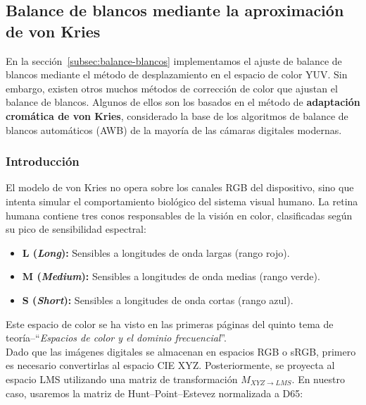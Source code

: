 \documentclass[11pt]{article}
\begin{document}
          \clearpage

  \subsection{Balance de blancos mediante la aproximación de von Kries}

      \noindent
      En la sección~\ref{subsec:balance-blancos} implementamos el ajuste de balance de blancos mediante el método de desplazamiento en el espacio de color YUV. Sin embargo, existen otros muchos métodos de corrección de color que ajustan el balance de blancos. Algunos de ellos son los basados en el método de \textbf{adaptación cromática de von Kries}, considerado la base de los algoritmos de balance de blancos automáticos (AWB) de la mayoría de las cámaras digitales modernas. \cite{enwiki:1310731594}

      \subsubsection{Introducción}

          \noindent
          El modelo de von Kries no opera sobre los canales RGB del dispositivo, sino que intenta simular el comportamiento biológico del sistema visual humano. La retina humana contiene tres conos responsables de la visión en color, clasificadas según su pico de sensibilidad espectral:

          \begin{itemize}
              \item \textbf{L (\textit{Long}):} Sensibles a longitudes de onda largas (rango rojo).

              \item \textbf{M (\textit{Medium}):} Sensibles a longitudes de onda medias (rango verde).

              \item \textbf{S (\textit{Short}):} Sensibles a longitudes de onda cortas (rango azul).
          \end{itemize}

          \noindent
          Este espacio de color se ha visto en las primeras páginas del quinto tema de teoría--``\textit{Espacios de color y el dominio frecuencial}''. \\

          Dado que las imágenes digitales se almacenan en espacios RGB o sRGB, primero es
          necesario convertirlas al espacio CIE XYZ. Posteriormente, se proyecta al
          espacio LMS utilizando una matriz de transformación $M_{XYZ \to LMS}$. En
          nuestro caso, usaremos la matriz de Hunt--Point--Estevez normalizada a D65:
          \cite{enwiki:1323929568}
\end{document}

